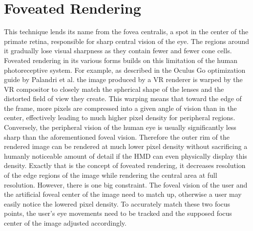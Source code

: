 
\section{Foveated Rendering}
This technique lends its name from the fovea centralis, a spot in the center of the primate retina, responsible for sharp central vision of the eye. The regions around it gradually lose visual sharpness as they contain fewer and fewer cone cells. 
Foveated rendering in its various forms builds on this limitation of the human photoreceptive system. For example, as described in the Oculus Go optimization guide by Palandri et al.\cite{Palandri.2018} the image produced by a \gls{VR} renderer is warped by the \gls{VR} compositor to closely match the spherical shape of the lenses and the distorted field of view they create. This warping means that toward the edge of the frame, more pixels are compressed into a given angle of vision than in the center, effectively leading to much higher pixel density for peripheral regions. Conversely, the peripheral vision of the human eye is usually significantly less sharp than the aforementioned foveal vision. Therefore the outer rim of the rendered image can be rendered at much lower pixel density without sacrificing a humanly noticeable amount of detail if the \gls{HMD} can even physically display this density. Exactly that is the concept of foveated rendering, it decreases resolution of the edge regions of the image while rendering the central area at full resolution. However, there is one big constraint. The foveal vision of the user and the artificial foveal center of the image need to match up, otherwise a user may easily notice the lowered pixel density. To accurately match these two focus points, the user's eye movements need to be tracked and the supposed focus center of the image adjusted accordingly. 

